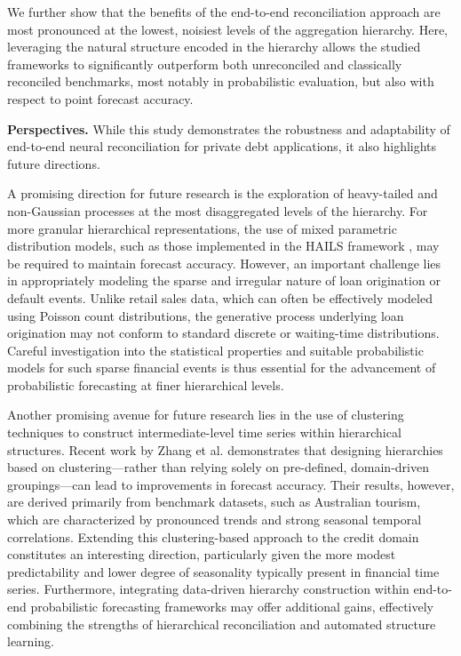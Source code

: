 \documentclass[letterpaper]{article}
\begin{document}
We further show that the benefits of the end-to-end reconciliation approach are most pronounced at the lowest,
noisiest levels of the aggregation hierarchy. 
Here, leveraging the natural structure encoded in the hierarchy allows the studied frameworks to significantly outperform both unreconciled and classically reconciled benchmarks, 
most notably in probabilistic evaluation, but also with respect to point forecast accuracy.

\textbf{Perspectives.} While this study demonstrates the robustness and adaptability of end-to-end neural reconciliation for private debt applications, it also highlights future directions. 

A promising direction for future research is the exploration of heavy-tailed and non-Gaussian processes at the most disaggregated levels of the hierarchy. 
For more granular hierarchical representations, the use of mixed parametric distribution models, such as those implemented in the HAILS framework \cite{HAILS}, may be required to maintain forecast accuracy. 
However, an important challenge lies in appropriately modeling the sparse and irregular nature of loan origination or default events. 
Unlike retail sales data, which can often be effectively modeled using Poisson count distributions, the generative process underlying loan origination may not conform to standard discrete or waiting-time distributions. 
Careful investigation into the statistical properties and suitable probabilistic models for such sparse financial events is thus essential for the advancement of probabilistic forecasting at finer hierarchical levels.

Another promising avenue for future research lies in the use of clustering techniques to construct intermediate-level time series within hierarchical structures. 
Recent work by Zhang et al.\cite{cluster} demonstrates that designing hierarchies based on clustering—rather than relying solely on pre-defined, domain-driven groupings—can lead to improvements in forecast accuracy. 
Their results, however, are derived primarily from benchmark datasets, such as Australian tourism, which are characterized by pronounced trends and strong seasonal temporal correlations. 
Extending this clustering-based approach to the credit domain constitutes an interesting direction, particularly given the more modest predictability and lower degree of seasonality typically present in financial time series. 
Furthermore, integrating data-driven hierarchy construction within end-to-end probabilistic forecasting frameworks may offer additional gains, effectively combining the strengths of hierarchical reconciliation and automated structure learning.
\end{document}

